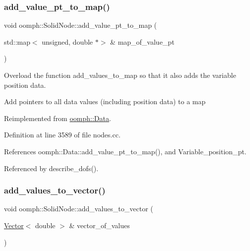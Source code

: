 \mbox{\label{classoomph_1_1SolidNode_a0c4a46d5a85e2a6d063c127b3df07058}} 
\subsubsection{\texorpdfstring{add\+\_\+value\+\_\+pt\+\_\+to\+\_\+map()}{add\_value\_pt\_to\_map()}}
{\footnotesize\ttfamily void oomph\+::\+Solid\+Node\+::add\+\_\+value\+\_\+pt\+\_\+to\+\_\+map (\begin{DoxyParamCaption}\item[{std\+::map$<$ unsigned, double $\ast$$>$ \&}]{map\+\_\+of\+\_\+value\+\_\+pt }\end{DoxyParamCaption})\hspace{0.3cm}{\ttfamily [virtual]}}



Overload the function add\+\_\+values\+\_\+to\+\_\+map so that it also adds the variable position data. 

Add pointers to all data values (including position data) to a map 

Reimplemented from \hyperlink{classoomph_1_1Data_aa4edecf3e781a28427a53a79dd062e39}{oomph\+::\+Data}.



Definition at line 3589 of file nodes.\+cc.



References oomph\+::\+Data\+::add\+\_\+value\+\_\+pt\+\_\+to\+\_\+map(), and Variable\+\_\+position\+\_\+pt.



Referenced by describe\+\_\+dofs().

\mbox{\label{classoomph_1_1SolidNode_a20562ea5133c1150b6999a73badb63e8}} 
\subsubsection{\texorpdfstring{add\+\_\+values\+\_\+to\+\_\+vector()}{add\_values\_to\_vector()}}
{\footnotesize\ttfamily void oomph\+::\+Solid\+Node\+::add\+\_\+values\+\_\+to\+\_\+vector (\begin{DoxyParamCaption}\item[{\hyperlink{classoomph_1_1Vector}{Vector}$<$ double $>$ \&}]{vector\+\_\+of\+\_\+values }\end{DoxyParamCaption})\hspace{0.3cm}{\ttfamily [virtual]}}



